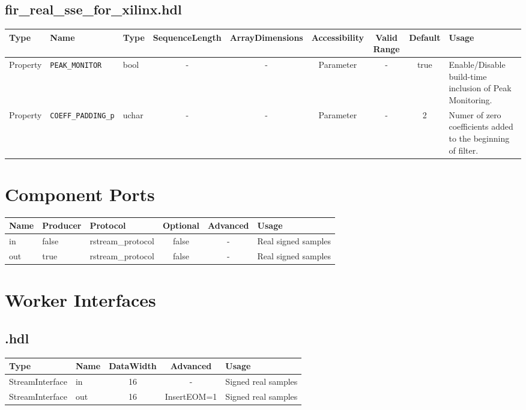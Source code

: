 \begin{landscape}
 \subsection*{fir\_real\_sse\_for\_xilinx.hdl}
	\begin{scriptsize}
		\begin{tabular}{|p{3cm}|p{2cm}|p{1cm}|c|c|c|c|c|p{5cm}|}
			\hline
			\rowcolor{blue}
			Type     & Name                 & Type  & SequenceLength & ArrayDimensions & Accessibility       & Valid Range & Default & Usage                                        \\
			\hline
			Property & \verb+PEAK_MONITOR+ & bool & -              & -               & Parameter &  -       & true      & Enable/Disable build-time inclusion of Peak Monitoring.                            \\
               \hline
			Property & \verb+COEFF_PADDING_p+  & uchar & -              & -               & Parameter &    -   & 2      & Numer of zero coefficients added to the beginning of filter.\\
			\hline
		\end{tabular}
	\end{scriptsize}
	
	\section*{Component Ports}
	\begin{scriptsize}
		\begin{tabular}{|M{2cm}|M{1.5cm}|M{4cm}|c|c|M{9cm}|}
			\hline
			\rowcolor{blue}
			Name & Producer & Protocol          & Optional & Advanced & Usage               \\
			\hline
			in   & false    & rstream\_protocol & false    & -        & Real signed samples \\
			\hline
			out  & true     & rstream\_protocol & false    & -        & Real signed samples \\
			\hline
		\end{tabular}
	\end{scriptsize}

	\section*{Worker Interfaces}
	\subsection*{\comp.hdl}
	\begin{scriptsize}
		\begin{tabular}{|M{2cm}|M{1.5cm}|c|c|M{12cm}|}
			\hline
			Type            & Name & DataWidth & Advanced                & Usage               \\
			\hline
			StreamInterface & in   & 16   & -     & Signed real samples \\
			\hline
			StreamInterface & out  & 16   & InsertEOM=1   & Signed real samples \\
			\hline
		\end{tabular}
	\end{scriptsize}
\end{landscape}


